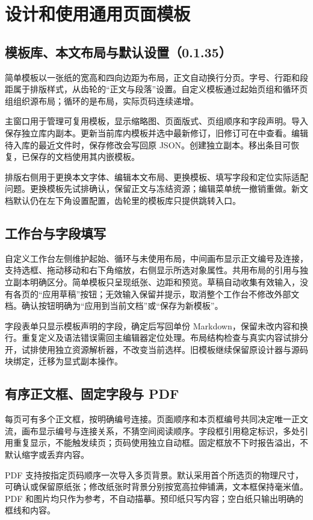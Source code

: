 \chapter{设计和使用通用页面模板}\label{ch:templates}
\section{模板库、本文布局与默认设置（0.1.35）}
简单模板以一张纸的宽高和四向边距为布局，正文自动换行分页。字号、行距和段距属于排版样式，从齿轮的“正文与段落”设置。自定义模板通过起始页组和循环页组组织源布局；循环的是布局，实际页码连续递增。

主窗口用于管理可复用模板，显示缩略图、页面版式、页组顺序和字段声明。导入保存独立库内副本。更新当前库内模板并选中最新修订，旧修订可在中查看。编辑待入库的最近文件时，保存修改会写回原 JSON。创建独立副本。移出条目可恢复，已保存的文档使用其内嵌模板。

排版右侧用于更换本文字体、编辑本文布局、更换模板、填写字段和定位实际适配问题。更换模板先试排确认，保留正文与冻结资源；编辑菜单统一撤销重做。新文档默认仍在左下角设置配置，齿轮里的模板库只提供跳转入口。

\section{工作台与字段填写}
自定义工作台左侧维护起始、循环与未使用布局，中间画布显示正文编号及连接，支持选框、拖动移动和右下角缩放，右侧显示所选对象属性。共用布局的引用与独立副本明确区分。简单模板只呈现纸张、边距和预览。草稿自动收集有效输入，没有各页的“应用草稿”按钮；无效输入保留并提示，取消整个工作台不修改外部文档。确认按钮明确为“应用到当前文档”或“保存为新模板”。

字段表单只显示模板声明的字段，确定后写回单份 Markdown，保留未改内容和换行。重复定义及语法错误需回主编辑器定位处理。布局结构检查与真实内容试排分开，试排使用独立资源解析器，不改变当前选样。旧模板继续保留原设计器与源码块绑定，迁移为显式副本操作。

\section{有序正文框、固定字段与 PDF}
每页可有多个正文框，按明确编号连接。页面顺序和本页框编号共同决定唯一正文流，画布显示编号与连接关系，不猜空间阅读顺序。字段框引用稳定标识，多处引用重复显示，不能触发续页；页码使用独立自动框。固定框放不下时报告溢出，不默认缩字或丢弃内容。

PDF 支持按指定页码顺序一次导入多页背景。默认采用首个所选页的物理尺寸，可确认或保留原纸张；修改纸张时背景分别按宽高拉伸铺满，文本框保持毫米值。PDF 和图片均只作为参考，不自动描摹。预印纸只写内容；空白纸只输出明确的框线和内容。

